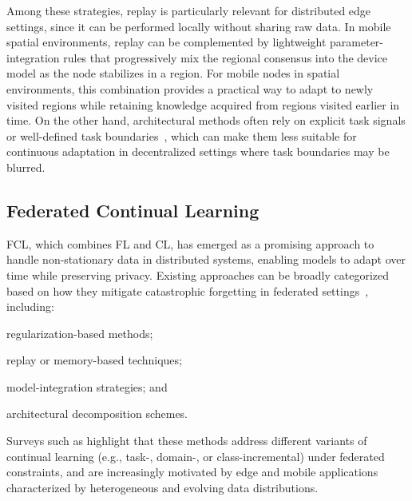 \documentclass[conference]{IEEEtran}
\theoremstyle{plain}
\theoremstyle{definition}
\begin{document}
Among these strategies, replay is particularly relevant for distributed edge settings,
since it can be performed locally without sharing raw data.
In mobile spatial environments, replay can be complemented by lightweight parameter-integration rules
that progressively mix the regional consensus into the device model as the node stabilizes in a region.
%
For mobile nodes in spatial environments,
 this combination provides a practical way to adapt to newly visited regions while retaining knowledge acquired from regions visited earlier in time. 
 On the other hand, architectural methods often rely on explicit task signals or well-defined task boundaries~\cite{rusu2016progressive,yoon2018lifelong,mallya2018packnet,mallya2018piggyback}, 
 which can make them less suitable for continuous adaptation in decentralized settings where task boundaries may be blurred.

\subsection{Federated Continual Learning}

\ac{FCL}, 
 which combines \ac{FL} and \ac{CL}, 
 has emerged as a promising approach to handle non-stationary data in distributed systems,
 enabling models to adapt over time while preserving privacy. 
% 
Existing approaches can be broadly categorized based on how 
 they mitigate catastrophic forgetting in federated settings~\cite{CRIADO2022263}, 
 including:
\begin{enumerate*}[label=(\roman*)]
    \item regularization-based methods;
    \item replay or memory-based techniques;
    \item model-integration strategies; and
    \item architectural decomposition schemes.
\end{enumerate*}
%
Surveys such as \cite{DBLP:journals/ijon/HamediRH25,DBLP:journals/corr/abs-2411-13740} 
 highlight that these methods address different variants of continual learning 
 (e.g., task-, domain-, or class-incremental) under federated constraints, 
 and are increasingly motivated by edge and mobile applications characterized 
 by heterogeneous and evolving data distributions.
\end{document}
